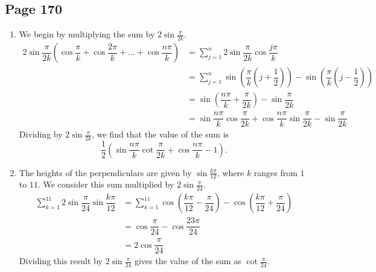 \documentclass{article}
\newenvironment{solutions}[1]
{\subsection*{#1}
 \begin{enumerate}[leftmargin=1.5em]}
{\end{enumerate}}
\newcommand{\solution}{\item}
\begin{document}
\begin{solutions}{Page 170}
\solution %
We begin by multiplying the sum by $2\sin{\tfrac{\pi}{2k}}$.
\begin{align*}
2\sin{\dfrac{\pi}{2k}} \left(\cos{\dfrac{\pi}{k}} + \cos{\dfrac{2\pi}{k}} + \ldots + \cos{\dfrac{n\pi}{k}} \right) &= \sum_{j=1}^{n} 2\sin{\dfrac{\pi}{2k}}\cos{\dfrac{j\pi}{k}} \\
&= \sum_{j=1}^{n} \sin\left(\dfrac{\pi}{k}\left(j+\dfrac{1}{2}\right)\right) - \sin\left(\dfrac{\pi}{k}\left(j-\dfrac{1}{2}\right)\right) \\
&= \sin\left(\dfrac{n\pi}{k} + \dfrac{\pi}{2k}\right) - \sin{\dfrac{\pi}{2k}} \\
&= \sin{\dfrac{n\pi}{k}}\cos{\dfrac{\pi}{2k}} + \cos{\dfrac{n\pi}{k}}\sin{\dfrac{\pi}{2k}} - \sin{\dfrac{\pi}{2k}}
\end{align*}
Dividing by $2\sin{\tfrac{\pi}{2k}}$, we find that the value of the sum is
\[
\dfrac{1}{2}\left(\sin{\dfrac{n\pi}{k}}\cot{\dfrac{\pi}{2k}} + \cos{\dfrac{n\pi}{k}} - 1\right).
\]
\solution %
The heights of the perpendiculars are given by $\sin{\tfrac{k\pi}{12}}$, where $k$ ranges from $1$ to $11$. We consider this sum multiplied by $2\sin{\tfrac{\pi}{24}}$.
\begin{align*}
\sum_{k=1}^{11} 2\sin{\dfrac{\pi}{24}}\sin{\dfrac{k\pi}{12}} &= \sum_{k=1}^{11} \cos\left(\dfrac{k\pi}{12}-\dfrac{\pi}{24}\right) - \cos\left(\dfrac{k\pi}{12}+\dfrac{\pi}{24}\right) \\
&= \cos{\dfrac{\pi}{24}}-\cos{\dfrac{23\pi}{24}} \\
&= 2\cos{\dfrac{\pi}{24}}
\end{align*}
Dividing this result by $2\sin{\tfrac{\pi}{24}}$ gives the value of the sum as $\cot{\tfrac{\pi}{24}}$.


\end{solutions}
\end{document}
